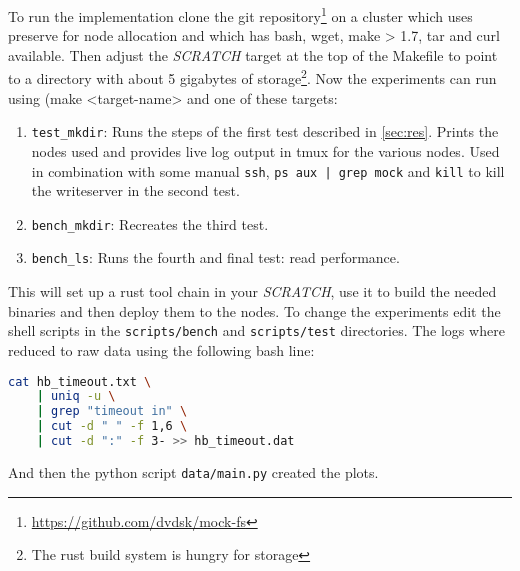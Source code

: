 To run the implementation clone the git repository\footnote{\url{https://github.com/dvdsk/mock-fs}} on a cluster which uses preserve for node allocation and which has bash, wget, make > 1.7, tar and curl available. Then adjust the \textit{SCRATCH} target at the top of the Makefile to point to a directory with about 5 gigabytes of storage\footnote{The rust build system is hungry for storage}. Now the experiments can run using (make <target-name> and one of these targets:

\begin{enumerate}
	\item \texttt{test\_mkdir}: Runs the steps of the first test described in \cref{sec:res}. Prints the nodes used and provides live log output in tmux for the various nodes. Used in combination with some manual \texttt{ssh}, \texttt{ps aux | grep mock} and \texttt{kill} to kill the writeserver in the second test. 
	\item \texttt{bench\_mkdir}: Recreates the third test.
	\item \texttt{bench\_ls}: Runs the fourth and final test: read performance.
\end{enumerate}

This will set up a rust tool chain in your \textit{SCRATCH}, use it to build the needed binaries and then deploy them to the nodes. To change the experiments edit the shell scripts in the \texttt{scripts/bench} and \texttt{scripts/test} directories. The logs where reduced to raw data using the following bash line:

\begin{lstlisting}[language=bash, style=boxed, tabsize=2]
cat hb_timeout.txt \
	| uniq -u \
	| grep "timeout in" \
	| cut -d " " -f 1,6 \
	| cut -d ":" -f 3- >> hb_timeout.dat
\end{lstlisting}

And then the python script \texttt{data/main.py} created the plots.
